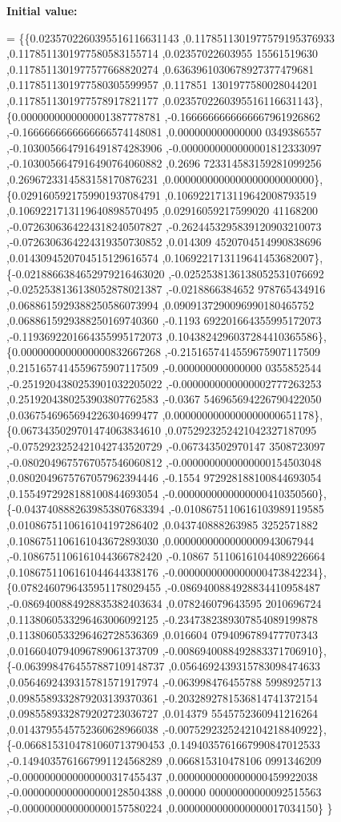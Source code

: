 {\bfseries Initial value\+:}
\begin{DoxyCode}
= \{\{0.0235702260395516116631143 ,0.1178511301977579195376933 ,0.1178511301977580583155714 ,0.02357022603955
      15561519630 ,0.1178511301977577668820274 ,0.6363961030678927377479681 ,0.1178511301977580305599957 ,0.117851
      1301977580028044201 ,0.1178511301977578917821177 ,0.0235702260395516116631143\},
\{0.0000000000000001387778781 ,-0.1666666666666667961926862 ,-0.1666666666666666574148081 ,0.000000000000000
      0349386557 ,-0.1030056647916491874283906 ,-0.0000000000000001812333097 ,-0.1030056647916490764060882 ,0.2696
      723314583159281099256 ,0.2696723314583158170876231 ,0.0000000000000000000000000\},
\{0.0291605921759901937084791 ,0.1069221713119642008793519 ,0.1069221713119640898570495 ,0.02916059217599020
      41168200 ,-0.0726306364224318240507827 ,-0.2624453295839120903210073 ,-0.0726306364224319350730852 ,0.014309
      4520704514990838696 ,0.0143094520704515129616574 ,0.1069221713119641453682007\},
\{-0.0218866384652979216463020 ,-0.0252538136138052531076692 ,-0.0252538136138052878021387 ,-0.0218866384652
      978765434916 ,0.0688615929388250586073994 ,0.0909137290096990180465752 ,0.0688615929388250169740360 ,-0.1193
      692201664355995172073 ,-0.1193692201664355995172073 ,0.1043824296037284410365586\},
\{0.0000000000000000832667268 ,-0.2151657414559675907117509 ,0.2151657414559675907117509 ,-0.000000000000000
      0355852544 ,-0.2519204380253901032205022 ,-0.0000000000000002777263253 ,0.2519204380253903807762583 ,-0.0367
      546965694226790422050 ,0.0367546965694226304699477 ,0.0000000000000000000651178\},
\{0.0673435029701474063834610 ,0.0752923252421042327187095 ,-0.0752923252421042743520729 ,-0.067343502970147
      3508723097 ,-0.0802049675767057546060812 ,-0.0000000000000000154503048 ,0.0802049675767057962394446 ,-0.1554
      972928188100844693054 ,0.1554972928188100844693054 ,-0.0000000000000000410350560\},
\{-0.0437408882639853807683394 ,-0.0108675110616103989119585 ,0.0108675110616104197286402 ,0.043740888263985
      3252571882 ,0.1086751106161043672893030 ,0.0000000000000000943067944 ,-0.1086751106161044366782420 ,-0.10867
      51106161044089226664 ,0.1086751106161044644338176 ,-0.0000000000000000473842234\},
\{0.0782460796435951178029455 ,-0.0869400884928834410958487 ,-0.0869400884928835382403634 ,0.078246079643595
      2010696724 ,0.1138060533296463006092125 ,-0.2347382389307854089199878 ,0.1138060533296462728536369 ,0.016604
      0794096789477707343 ,0.0166040794096789061373709 ,-0.0086940088492883371706910\},
\{-0.0639984764557887109148737 ,0.0564692439315783098474633 ,0.0564692439315781571917974 ,-0.063998476455788
      5998925713 ,0.0985589332879203139370361 ,-0.2032892781536814741372154 ,0.0985589332879202723036727 ,0.014379
      5545752360941216264 ,0.0143795545752360628966038 ,-0.0075292325242104218840922\},
\{-0.0668153104781060713790453 ,0.1494035761667990847012533 ,-0.1494035761667991124568289 ,0.066815310478106
      0991346209 ,-0.0000000000000000317455437 ,0.0000000000000000459922038 ,-0.0000000000000000128504388 ,0.00000
      00000000000092515563 ,-0.0000000000000000157580224 ,0.0000000000000000017034150\}
\}
\end{DoxyCode}
